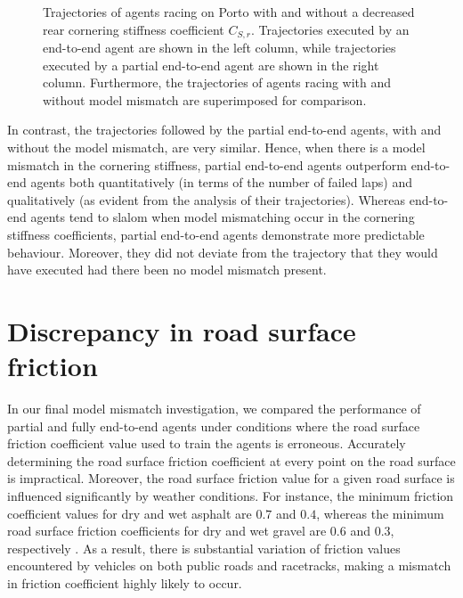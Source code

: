 \begin{figure}[htb!]
    \centering
    
    \caption[Trajectories of agents racing with and without a decreased rear cornering stiffness coefficient]{Trajectories of agents racing on Porto with and without a decreased rear cornering stiffness coefficient $C_{S,r}$. Trajectories executed by an end-to-end agent are shown in the left column, while trajectories executed by a partial end-to-end agent are shown in the right column. Furthermore, the trajectories of agents racing with and without model mismatch are superimposed for comparison.}
    \label{fig:c_sr}
\end{figure}

In contrast, the trajectories followed by the partial end-to-end agents, with and without the model mismatch, are very similar.
Hence, when there is a model mismatch in the cornering stiffness, partial end-to-end agents outperform end-to-end agents both quantitatively (in terms of the number of failed laps) and qualitatively (as evident from the analysis of their trajectories).
Whereas end-to-end agents tend to slalom when model mismatching occur in the cornering stiffness coefficients, partial end-to-end agents demonstrate more predictable behaviour.
Moreover, they did not deviate from the trajectory that they would have executed had there been no model mismatch present.


\section{Discrepancy in road surface friction}

In our final model mismatch investigation, we compared the performance of partial and fully end-to-end agents under conditions where the road surface friction coefficient value used to train the agents is erroneous.
Accurately determining the road surface friction coefficient at every point on the road surface is impractical.
Moreover, the road surface friction value for a given road surface is influenced significantly by weather conditions.
For instance, the minimum friction coefficient values for dry and wet asphalt are $0.7$ and $0.4$, whereas the minimum road surface friction coefficients for dry and wet gravel are $0.6$ and $0.3$, respectively \cite{Novikov2018}. 
As a result, there is substantial variation of friction values encountered by vehicles on both public roads and racetracks, making a mismatch in friction coefficient highly likely to occur.

